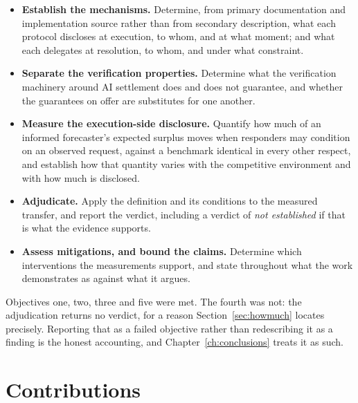 \begin{itemize}
  \item \textbf{Establish the mechanisms.} Determine, from primary documentation and
    implementation source rather than from secondary description, what each protocol
    discloses at execution, to whom, and at what moment; and what each delegates at
    resolution, to whom, and under what constraint.
  \item \textbf{Separate the verification properties.} Determine what the verification
    machinery around AI settlement does and does not guarantee, and whether the guarantees
    on offer are substitutes for one another.
  \item \textbf{Measure the execution-side disclosure.} Quantify how much of an informed
    forecaster's expected surplus moves when responders may condition on an observed
    request, against a benchmark identical in every other respect, and establish how that
    quantity varies with the competitive environment and with how much is disclosed.
  \item \textbf{Adjudicate.} Apply the definition and its conditions to the measured
    transfer, and report the verdict, including a verdict of \emph{not established} if that
    is what the evidence supports.
  \item \textbf{Assess mitigations, and bound the claims.} Determine which interventions the
    measurements support, and state throughout what the work demonstrates as against what it
    argues.
\end{itemize}

Objectives one, two, three and five were met. The fourth was not: the adjudication returns
no verdict, for a reason Section~\ref{sec:howmuch} locates precisely. Reporting that as a
failed objective rather than redescribing it as a finding is the honest accounting, and
Chapter~\ref{ch:conclusions} treats it as such.

\section{Contributions}
\label{sec:contributions}

